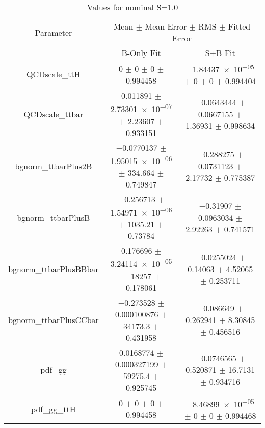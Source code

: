 \begin{table}
\centering
\caption{Values for nominal S=1.0}
\begin{tabular}{ccc}
\toprule
Parameter & \multicolumn{2}{c}{Mean $\pm$ Mean Error $\pm$ RMS $\pm$ Fitted Error}\\
 & B-Only Fit & S+B Fit\\
\midrule
QCDscale\_ttH & \num{0} $\pm$ \num{0} $\pm$ \num{0} $\pm$ \num{0.994458} & \num{-1.84437e-05} $\pm$ \num{0} $\pm$ \num{0} $\pm$ \num{0.994404}\\
QCDscale\_ttbar & \num{0.011891} $\pm$ \num{2.73301e-07} $\pm$ \num{2.23607} $\pm$ \num{0.933151} & \num{-0.0643444} $\pm$ \num{0.0667155} $\pm$ \num{1.36931} $\pm$ \num{0.998634}\\
bgnorm\_ttbarPlus2B & \num{-0.0770137} $\pm$ \num{1.95015e-06} $\pm$ \num{334.664} $\pm$ \num{0.749847} & \num{-0.288275} $\pm$ \num{0.0731123} $\pm$ \num{2.17732} $\pm$ \num{0.775387}\\
bgnorm\_ttbarPlusB & \num{-0.256713} $\pm$ \num{1.54971e-06} $\pm$ \num{1035.21} $\pm$ \num{0.73784} & \num{-0.31907} $\pm$ \num{0.0963034} $\pm$ \num{2.92263} $\pm$ \num{0.741571}\\
bgnorm\_ttbarPlusBBbar & \num{0.176696} $\pm$ \num{3.24114e-05} $\pm$ \num{18257} $\pm$ \num{0.178061} & \num{-0.0255024} $\pm$ \num{0.14063} $\pm$ \num{4.52065} $\pm$ \num{0.253711}\\
bgnorm\_ttbarPlusCCbar & \num{-0.273528} $\pm$ \num{0.000100876} $\pm$ \num{34173.3} $\pm$ \num{0.431958} & \num{-0.086649} $\pm$ \num{0.262941} $\pm$ \num{8.30845} $\pm$ \num{0.456516}\\
pdf\_gg & \num{0.0168774} $\pm$ \num{0.000327199} $\pm$ \num{59275.4} $\pm$ \num{0.925745} & \num{-0.0746565} $\pm$ \num{0.520871} $\pm$ \num{16.7131} $\pm$ \num{0.934716}\\
pdf\_gg\_ttH & \num{0} $\pm$ \num{0} $\pm$ \num{0} $\pm$ \num{0.994458} & \num{-8.46899e-05} $\pm$ \num{0} $\pm$ \num{0} $\pm$ \num{0.994468}\\
\bottomrule
\end{tabular}
\end{table}
